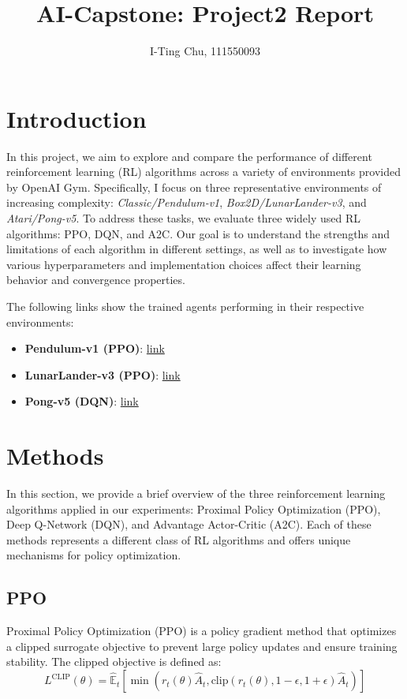\documentclass[10pt,twocolumn,letterpaper]{article}
\begin{document}
\title{\LARGE AI-Capstone: Project2 Report}
\author{I-Ting Chu, 111550093}
\maketitle

\section{Introduction}
\label{sec:intro}

In this project, we aim to explore and compare the performance of different reinforcement learning (RL) algorithms across a variety of environments provided by OpenAI Gym. Specifically, I focus on three representative environments of increasing complexity: \textit{Classic/Pendulum-v1}, \textit{Box2D/LunarLander-v3}, and \textit{Atari/Pong-v5}. To address these tasks, we evaluate three widely used RL algorithms: PPO, DQN, and A2C. Our goal is to understand the strengths and limitations of each algorithm in different settings, as well as to investigate how various hyperparameters and implementation choices affect their learning behavior and convergence properties.

The following links show the trained agents performing in their respective environments:

\begin{itemize}
  \item \textbf{Pendulum-v1 (PPO)}: \href{https://youtube.com/shorts/AXvGvR7J8uM?feature=share}{link}
  \item \textbf{LunarLander-v3 (PPO)}: \href{https://youtu.be/Gy7jJm2cdyU}{link}
  \item \textbf{Pong-v5 (DQN)}: \href{https://youtube.com/shorts/BkrJ5J7AKvU?feature=share}{link}
\end{itemize}

\section{Methods}
\label{sec:methods}
In this section, we provide a brief overview of the three reinforcement learning algorithms applied in our experiments: Proximal Policy Optimization (PPO), Deep Q-Network (DQN), and Advantage Actor-Critic (A2C). Each of these methods represents a different class of RL algorithms and offers unique mechanisms for policy optimization.
\subsection{PPO}
Proximal Policy Optimization (PPO) is a policy gradient method that optimizes a clipped surrogate objective to prevent large policy updates and ensure training stability. The clipped objective is defined as:
\begin{equation*}
L^{\text{CLIP}}(\theta) = \hat{\mathbb{E}}_t \left[ \min\left( r_t(\theta) \hat{A}_t, \text{clip}(r_t(\theta), 1 - \epsilon, 1 + \epsilon) \hat{A}_t \right) \right]
\end{equation*}
\end{document}
